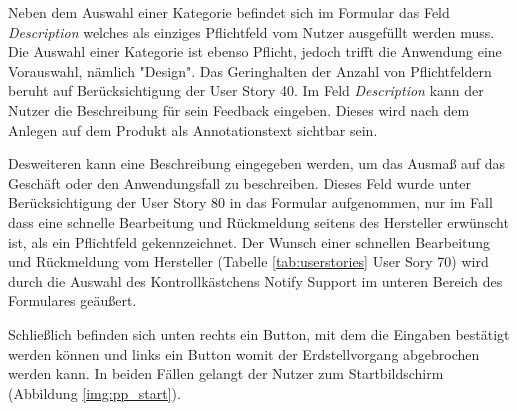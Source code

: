Neben dem Auswahl einer Kategorie befindet sich im Formular das Feld \textit{Description} welches als einziges Pflichtfeld vom Nutzer ausgefüllt werden muss. 
Die Auswahl einer Kategorie ist ebenso Pflicht,  jedoch trifft die Anwendung eine Vorauswahl, nämlich "Design". Das Geringhalten der Anzahl von Pflichtfeldern beruht auf  Berücksichtigung der User Story 40. Im Feld \textit{Description} kann der Nutzer die Beschreibung für sein Feedback eingeben. Dieses wird nach dem Anlegen auf dem Produkt als Annotationstext sichtbar sein. 
 
Desweiteren kann eine Beschreibung eingegeben werden, um das Ausmaß auf das Geschäft oder den Anwendungsfall zu beschreiben. 
Dieses Feld wurde unter Berücksichtigung der User Story 80 in das Formular aufgenommen, nur im Fall dass eine schnelle Bearbeitung und Rückmeldung seitens des Hersteller erwünscht ist, als ein Pflichtfeld gekennzeichnet. 
Der Wunsch einer schnellen Bearbeitung und Rückmeldung vom Hersteller (Tabelle \ref{tab:userstories} User Sory 70) wird durch die Auswahl des Kontrollkästchens Notify Support im unteren Bereich des Formulares geäußert. 

Schließlich befinden sich unten rechts ein Button, mit dem die Eingaben bestätigt werden können und links ein Button womit der Erdstellvorgang abgebrochen werden kann. In beiden Fällen gelangt der Nutzer 
zum Startbildschirm (Abbildung \ref{img:pp_start}).

